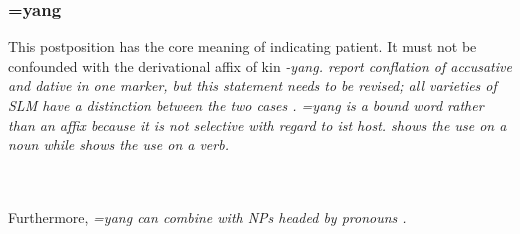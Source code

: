 
% 

% 

\subsubsection{=yang}\label{sec:morph:=yang}
This postposition has the core meaning of indicating patient\citep[24]{Ansaldo2008genesis}. It must not be confounded with the  derivational affix of kin \em -yang\em {}. \citet{SmithEtAl2004} report conflation of accusative and dative in one marker, but this statement needs to be revised;  all varieties of SLM have a distinction between the two cases \citep{Ansaldo2005ms, Ansaldo2008genesis, Ansaldo2009book, Slomanson2007cll}.
\em =yang \em is a bound word rather than an affix because it is not selective with regard to ist host.  shows the use on a noun while  shows the use on a verb.


 \\
 \\
Furthermore, \em =yang \em can combine with NPs headed by pronouns .

